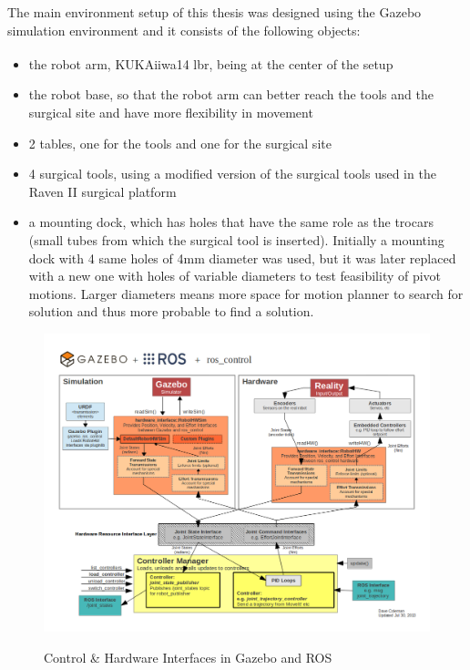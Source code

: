 The main environment setup of this thesis was designed using the Gazebo simulation environment and 
it consists of the following objects:
\begin{itemize}
\item the robot arm, KUKA\textsuperscript \textregistered iiwa14 lbr, being at the center of the setup
\item the robot base, so that the robot arm can better reach the tools and the surgical site and have more flexibility in movement
\item 2 tables, one for the tools and one for the surgical site
\item 4 surgical tools, using a modified version of the surgical tools used in the Raven II surgical platform
\item a mounting dock, which has holes that have the same role as the trocars (small tubes from 
which the surgical tool is inserted). Initially a mounting dock with 4 same holes of 4mm diameter was used, but it was later replaced with a new one with holes of variable diameters to test feasibility of pivot motions. Larger diameters means more space for motion planner to search for solution and thus more probable to find a solution.
\end{itemize}

\begin{center}
\begin{figure}[H]
\centering
\includegraphics[width=12cm]{images/Gazebo_ros_transmission.png}\\
\caption{Control \& Hardware Interfaces in Gazebo and ROS}
\end{figure}
\end{center}


